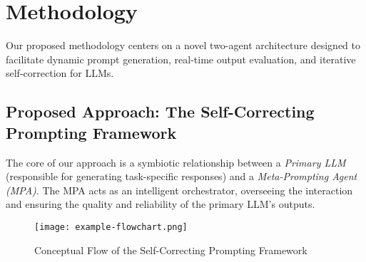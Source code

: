 \documentclass{article}
\begin{document}
\section{Methodology}
Our proposed methodology centers on a novel two-agent architecture designed to facilitate dynamic prompt generation, real-time output evaluation, and iterative self-correction for LLMs.

\subsection{Proposed Approach: The Self-Correcting Prompting Framework}
The core of our approach is a symbiotic relationship between a \textit{Primary LLM} (responsible for generating task-specific responses) and a \textit{Meta-Prompting Agent (MPA)}. The MPA acts as an intelligent orchestrator, overseeing the interaction and ensuring the quality and reliability of the primary LLM's outputs.

\begin{figure}[h!]
    \centering
    \texttt{[image: example-flowchart.png]} %
    \caption{Conceptual Flow of the Self-Correcting Prompting Framework}
    \label{fig:flowchart}
\end{figure}
\end{document}
